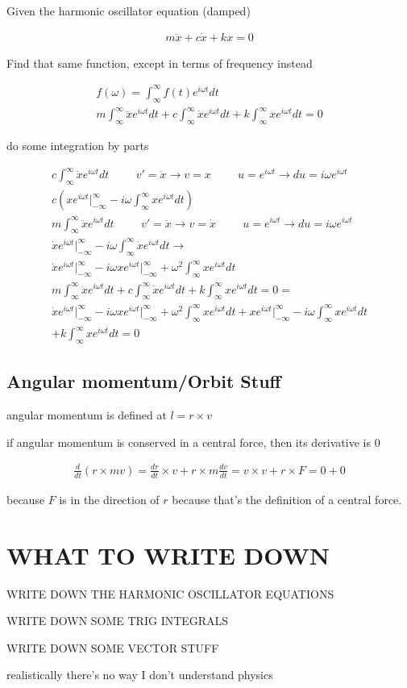 \documentclass[fleqn]{article}
\newcommand{\hp}{\hspace{1cm}}
\newcommand{\equations} [1] {
\begin{gather*}
#1
\end{gather*}
}
\begin{document}
Given the harmonic oscillator equation (damped)
\equations{
    m \ddot x + c \dot x + k x = 0
}
Find that same function, except in terms of frequency instead 
\equations{
    f(\omega) = \int^{\infty}_{\infty} f(t) e^{i \omega t} dt 
    \\
    m \int^{\infty}_{\infty} \ddot x e^{i \omega t} dt + 
    c \int^{\infty}_{\infty} \dot x e^{i \omega t} dt + 
    k \int^{\infty}_{\infty} x e^{i \omega t} dt = 0
}
do some integration by parts 
\equations{
    c \int^{\infty}_{\infty} \dot x e^{i \omega t} dt
    \hp 
    v' = \dot x \rightarrow v = x
    \hp 
    u = e^{i \omega t}
    \rightarrow 
    du = i \omega e^{i \omega t}
    \\
    c 
    (
    x e^{i \omega t} \Big|^{\infty}_{-\infty}
    -
    i \omega \int^{\infty}_{\infty} x e^{i \omega t} dt
    )
    \\
    m \int^{\infty}_{\infty} \ddot x e^{i \omega t} dt 
    \hp
    v' = \ddot x \rightarrow v = \dot x
    \hp 
    u = e^{i \omega t}
    \rightarrow 
    du = i \omega e^{i \omega t}
    \\
    \dot x e^{i \omega t} \Big|^{\infty}_{-\infty}
    -
    i \omega \int^{\infty}_{\infty} \dot x e^{i \omega t} dt
    \rightarrow 
    \\
    \dot x e^{i \omega t} \Big|^{\infty}_{-\infty}
    -
    i \omega x e^{i \omega t} \Big|^{\infty}_{-\infty}
    +
    \omega^2 \int^{\infty}_{\infty} x e^{i \omega t} dt
    \\
    m \int^{\infty}_{\infty} \ddot x e^{i \omega t} dt + 
    c \int^{\infty}_{\infty} \dot x e^{i \omega t} dt + 
    k \int^{\infty}_{\infty} x e^{i \omega t} dt = 0
    =
    \\
    \dot x e^{i \omega t} \Big|^{\infty}_{-\infty}
    -
    i \omega x e^{i \omega t} \Big|^{\infty}_{-\infty}
    +
    \omega^2 \int^{\infty}_{\infty} x e^{i \omega t} dt
    +
    x e^{i \omega t} \Big|^{\infty}_{-\infty}
    -
    i \omega \int^{\infty}_{\infty} x e^{i \omega t} dt
    \\
    +
    k \int^{\infty}_{\infty} x e^{i \omega t} dt = 0
}

\subsection{Angular momentum/Orbit Stuff}
angular momentum is defined at $l = r \times v$ 

if angular momentum is conserved in a central force, then its derivative is 0
\equations{
    \frac{d}{dt} (r \times mv) 
    =
    \frac{dr}{dt} \times v + r \times m\frac{dv}{dt}
    =
    v \times v + r \times F = 0 + 0
}
because $F$ is in the direction of $r$ because that's the definition of a central
force. 

\section{WHAT TO WRITE DOWN}
WRITE DOWN THE HARMONIC OSCILLATOR EQUATIONS 

WRITE DOWN SOME TRIG INTEGRALS 

WRITE DOWN SOME VECTOR STUFF 

realistically there's no way I don't understand physics
\end{document}
